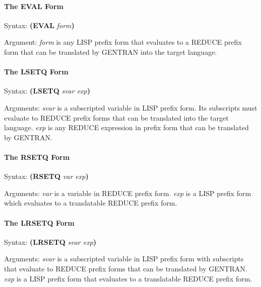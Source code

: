 \paragraph{The EVAL Form}
\label{sym:eval}
\begin{describe}{Syntax:} 
{\bf (EVAL} {\it form\/}{\bf )}
\end{describe}
\begin{describe}{Argument:}
{\it form\/} is any LISP prefix form that evaluates to a REDUCE prefix form
that can be translated by GENTRAN into the target language.
\end{describe}

\paragraph{The LSETQ Form} 
\begin{describe}{Syntax:}
{\bf (LSETQ} {\it svar exp\/}{\bf )}
\end{describe}
\begin{describe}{Arguments:}
{\it svar\/} is a subscripted variable in LISP prefix form.  Its subscripts
must evaluate to REDUCE prefix forms that can be translated
into the target language.  {\it exp\/} is any REDUCE expression in
prefix form that can be translated by GENTRAN.
\end{describe}

\paragraph{The RSETQ Form} 
\begin{describe}{Syntax:}
{\bf (RSETQ} {\it var exp\/}{\bf )}
\end{describe}
\begin{describe}{Arguments:}
{\it var\/} is a variable in REDUCE prefix form.  {\it exp\/} is a LISP
prefix form which evaluates to a translatable REDUCE prefix form.
\end{describe}

\paragraph{The LRSETQ Form} 
\label{sym:lrsetq}
\begin{describe}{Syntax:}
{\bf (LRSETQ} {\it svar exp\/}{\bf )}
\end{describe}
\begin{describe}{Arguments:}
{\it svar\/} is a subscripted variable in LISP prefix form with
subscripts that evaluate to REDUCE prefix forms
that can be translated by GENTRAN.  {\it exp\/} is a LISP prefix
form that evaluates to a translatable REDUCE prefix form.
\end{describe}

